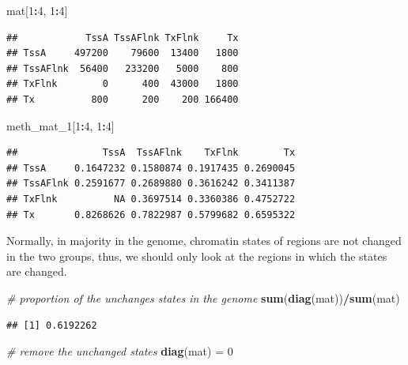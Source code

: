 \documentclass[]{book}
\newenvironment{Shaded}{\begin{snugshade}}{\end{snugshade}}
\newcommand{\KeywordTok}[1]{\textcolor[rgb]{0.13,0.29,0.53}{\textbf{#1}}}
\newcommand{\DecValTok}[1]{\textcolor[rgb]{0.00,0.00,0.81}{#1}}
\newcommand{\StringTok}[1]{\textcolor[rgb]{0.31,0.60,0.02}{#1}}
\newcommand{\CommentTok}[1]{\textcolor[rgb]{0.56,0.35,0.01}{\textit{#1}}}
\newcommand{\OperatorTok}[1]{\textcolor[rgb]{0.81,0.36,0.00}{\textbf{#1}}}
\newcommand{\NormalTok}[1]{#1}
\theoremstyle{definition}
\theoremstyle{definition}
\theoremstyle{remark}
\begin{document}
\begin{Shaded}
\begin{Highlighting}[]
\NormalTok{mat[}\DecValTok{1}\OperatorTok{:}\DecValTok{4}\NormalTok{, }\DecValTok{1}\OperatorTok{:}\DecValTok{4}\NormalTok{]}
\end{Highlighting}
\end{Shaded}

\begin{verbatim}
##            TssA TssAFlnk TxFlnk     Tx
## TssA     497200    79600  13400   1800
## TssAFlnk  56400   233200   5000    800
## TxFlnk        0      400  43000   1800
## Tx          800      200    200 166400
\end{verbatim}

\begin{Shaded}
\begin{Highlighting}[]
\NormalTok{meth_mat_}\DecValTok{1}\NormalTok{[}\DecValTok{1}\OperatorTok{:}\DecValTok{4}\NormalTok{, }\DecValTok{1}\OperatorTok{:}\DecValTok{4}\NormalTok{]}
\end{Highlighting}
\end{Shaded}

\begin{verbatim}
##               TssA  TssAFlnk    TxFlnk        Tx
## TssA     0.1647232 0.1580874 0.1917435 0.2690045
## TssAFlnk 0.2591677 0.2689880 0.3616242 0.3411387
## TxFlnk          NA 0.3697514 0.3360386 0.4752722
## Tx       0.8268626 0.7822987 0.5799682 0.6595322
\end{verbatim}

Normally, in majority in the genome, chromatin states of regions are not
changed in the two groups, thus, we should only look at the regions in
which the states are changed.

\begin{Shaded}
\begin{Highlighting}[]
\CommentTok{# proportion of the unchanges states in the genome}
\KeywordTok{sum}\NormalTok{(}\KeywordTok{diag}\NormalTok{(mat))}\OperatorTok{/}\KeywordTok{sum}\NormalTok{(mat)}
\end{Highlighting}
\end{Shaded}

\begin{verbatim}
## [1] 0.6192262
\end{verbatim}

\begin{Shaded}
\begin{Highlighting}[]
\CommentTok{# remove the unchanged states}
\KeywordTok{diag}\NormalTok{(mat) =}\StringTok{ }\DecValTok{0}
\end{Highlighting}
\end{Shaded}
\end{document}
